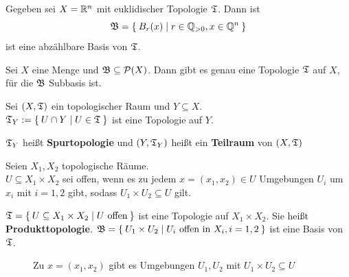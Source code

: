 \begin{beispiel}
    Gegeben sei $X = \mathbb{R}^n$ mit euklidischer Topologie $\mathfrak{T}$. Dann ist
    \[\mathfrak{B} = \Set{B_r(x) | r \in \ensuremath{\mathbb{Q}}_{> 0}, x \in \ensuremath{\mathbb{Q}}^n}\]
    ist eine abzählbare Basis von $\mathfrak{T}$.
\end{beispiel}

\begin{bemerkung}
    Sei $X$ eine Menge und $\mathfrak{B} \subseteq \mathcal{P}(X)$. Dann gibt es
    genau eine Topologie $\mathfrak{T}$ auf $X$, für die $\mathfrak{B}$ Subbasis ist.
\end{bemerkung}

\begin{definition}  
    Sei $(X, \mathfrak{T})$ ein topologischer Raum und $Y \subseteq X$.\\
    $\mathfrak{T}_Y := \Set{U \cap Y | U \in \mathfrak{T}}$ ist eine Topologie auf $Y$.

    $\mathfrak{T}_Y$ heißt \textbf{Spurtopologie} und $(Y, \mathfrak{T}_Y)$ heißt ein 
    \textbf{Teilraum} von $(X, \mathfrak{T})$
\end{definition}

\begin{definition} 
    Seien $X_1, X_2$ topologische Räume.\\
    $U \subseteq X_1 \times X_2$ sei offen, wenn es zu jedem $x = (x_1, x_2) \in U$
    Umgebungen $U_i$ um $x_i$  mit $i=1,2$ gibt, sodass $U_1 \times U_2 \subseteq U$
    gilt.

    $\mathfrak{T} = \Set{U \subseteq X_1 \times X_2 | U \text{ offen}}$
    ist eine Topologie auf $X_1 \times X_2$. Sie heißt \textbf{Produkttopologie}.
    $\mathfrak{B} = \Set{U_1 \times U_2 | U_i \text{ offen in } X_i, i=1,2}$
    ist eine Basis von $\mathfrak{T}$.
\end{definition}

\begin{figure}[htp]
    \centering
    
    \caption{Zu $x=(x_1, x_2)$ gibt es Umgebungen $U_1, U_2$ mit $U_1 \times U_2 \subseteq U$}
\end{figure}

